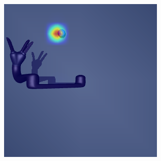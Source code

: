 \begin{figure}[h!]
\begin{subfigure}{0.24\columnwidth}
  \end{subfigure}
  \begin{subfigure}{0.24\columnwidth}
    \includegraphics[width=\linewidth]{figures/chapter6/distractor_saliency_jaco_pro_on/standard_sensor_std}
  \end{subfigure}
  

\end{figure}
